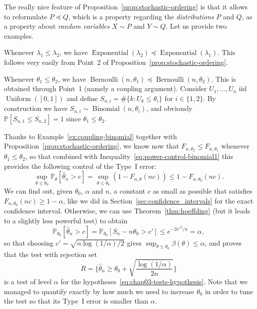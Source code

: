 \documentclass[
	fontsize=11pt, %
	twoside=false, %
	numbers=noenddot, %
]{kaobook}
\DeclareMathOperator{\ber}{Bernoulli}
\DeclareMathOperator{\bin}{Binomial}
\DeclareMathOperator{\expo}{Exponential}
\DeclareMathOperator{\uni}{Uniform}
\renewcommand{\P}{\mathbb P}
\newcommand{\wh}{\widehat}
\newcommand{\lest}{\preceq}
\begin{document}
The really nice feature of Proposition~\ref{prop:stochastic-ordering} is that it allows to reformulate $P \lest Q$, which is a property regarding the \emph{distributions} $P$ and $Q$, as a property about \emph{random variables} $X \sim P$ and $Y \sim Q$.
Let us provide two examples.
\begin{example}
	Whenever $\lambda_1 \leq \lambda_2$, we have $\expo(\lambda_2) \lest \expo(\lambda_1)$. This follows very easily from Point~2 of Proposition~\ref{prop:stochastic-ordering}.
\end{example}
\begin{example}
	\label{ex:coupling-binomial}
	Whenever $\theta_1 \leq \theta_2$, we have $\ber(n, \theta_1) \lest \ber(n, \theta_2)$. This is obtained through Point~1 (namely a coupling argument).
	Consider $U_1, \ldots, U_n$ iid $\uni([0, 1])$ and define $S_{n, i} = \# \{ k : U_k \leq \theta_i \}$ for $i \in \{ 1, 2 \}$. By construction we have $S_{n, i} \sim \bin(n, \theta_i)$, and obviously $\P[S_{n, 1} \leq S_{n, 2}] = 1$ since $\theta_1 \leq \theta_2$.
\end{example}
Thanks to Example~\ref{ex:coupling-binomial} together with Proposition~\ref{prop:stochastic-ordering}, we know now that $F_{n, \theta_2} \leq F_{n, \theta_1}$ whenever $\theta_1 \leq \theta_2$, so that combined with Inequality~\eqref{eq:power-control-binomial1} this provides the following control of the Type~I error:
\begin{equation*}
	\sup_{\theta \leq \theta_0} \P_\theta[ \wh \theta_n > c] = \sup_{\theta \leq \theta_0} (1 - F_{n, \theta}(n c)) \leq 1 - F_{n, \theta_0}(n c).
\end{equation*}
We can find out, given $\theta_0$, $\alpha$ and $n$, a constant $c$ as small as possible that satisfies $F_{n, \theta_0}(n c) \geq 1 - \alpha$, like we did in Section~\ref{sec:confidence_intervals} for the exact confidence interval.
Otherwise, we can use Theorem~\ref{thm:hoeffding} (but it leads to a slightly less powerful test) to obtain
\begin{equation*}
	\P_{\theta_0} [\wh \theta_n > c] = \P_{\theta_0}[S_n - n \theta_0 > c'] \leq e^{-2 c'^2 / n} = \alpha,
\end{equation*}
so that choosing $c' = \sqrt{n \log(1 / \alpha) / 2}$ gives $\sup_{\theta \leq \theta_0} \beta(\theta) \leq \alpha$, and proves that the test with rejection set 
\begin{equation*}
	R = \bigg\{ \wh \theta_n \geq \theta_0 + \sqrt{ \frac{\log(1 / \alpha)}{2n}} \bigg\}
\end{equation*}
is a test of level $\alpha$ for the hypotheses~\eqref{eq:chap03-tests-hypothesis}.
Note that we managed to quantify exactly by how much we need to increase $\theta_0$ in order to tune the test so that its Type~I error is smaller than $\alpha$.
\end{document}
